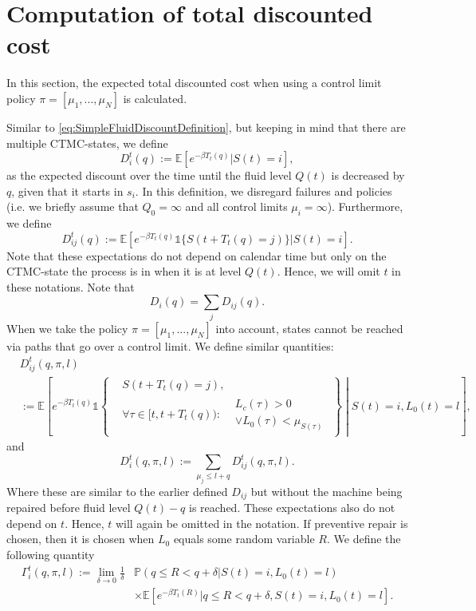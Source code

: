 \section{Computation of total discounted cost}
In this section, the expected total discounted cost when using a control limit policy $\pi=[\mu_1,...,\mu_N]$ is calculated.

Similar to \eqref{eq:SimpleFluidDiscountDefinition}, but keeping in mind that there are multiple CTMC-states, we define
\[
D_{i}^t(q):=\mathbb{E}[e^{-\beta T_t(q)}|S(t)=i],
\]
as the expected discount over the time until the fluid level $Q(t)$ is decreased by $q$, given that it starts in $s_i$.
In this definition, we disregard failures and policies (i.e. we briefly assume that $Q_0=\infty$ and all control limits $\mu_i=\infty$).
Furthermore, we define
\[
D_{ij}^t(q):=\mathbb{E}[e^{-\beta T_t(q)}\mathds{1}\{S(t+T_t(q)=j)\}|S(t)=i].
\]
Note that these expectations do not depend on calendar time but only on the CTMC-state the process is in when it is at level $Q(t)$.
Hence, we will omit $t$ in these notations.
Note that
\[
D_{i}(q)=\sum\limits_{j}D_{ij}(q).
\]
When we take the policy $\pi=[\mu_1,...,\mu_N]$ into account, states cannot be reached via paths that go over a control limit.
We define similar quantities:
\[
\begin{split}
&D_{ij}^t(q,\pi,l)\\
&:=\mathbb{E}\left[e^{-\beta T_t(q)}\mathds{1}\left\{\begin{split}
&S(t+T_t(q)=j),\\
&\forall \tau\in[t,t+T_t(q)):
\begin{split}
&L_c(\tau)>0\\&\vee L_0(\tau)<\mu_{S(\tau)}
\end{split}
\end{split}\right\}\middle| S(t)=i,L_0(t)=l\right],
\end{split}
\]
and
\[
D_{i}^t(q,\pi,l):=\sum\limits_{\mu_j\leq l+q}D_{ij}^t(q,\pi,l).
\]
Where these are similar to the earlier defined $D_{ij}$ but without the machine being repaired before fluid level $Q(t)-q$ is reached.
These expectations also do not depend on $t$.
Hence, $t$ will again be omitted in the notation.
If preventive repair is chosen, then it is chosen when $L_0$ equals some random variable $R$.
We define the following quantity
\[
\begin{split}
\Gamma_i^t(q,\pi,l):=\lim\limits_{\delta\rightarrow 0}\frac1\delta&\mathbb{P}(q\leq R<q+\delta|S(t)=i,L_0(t)=l)\\
&\times\mathbb{E}[e^{-\beta T_t(R)}|q\leq R<q+\delta,S(t)=i,L_0(t)=l].
\end{split}
\]
